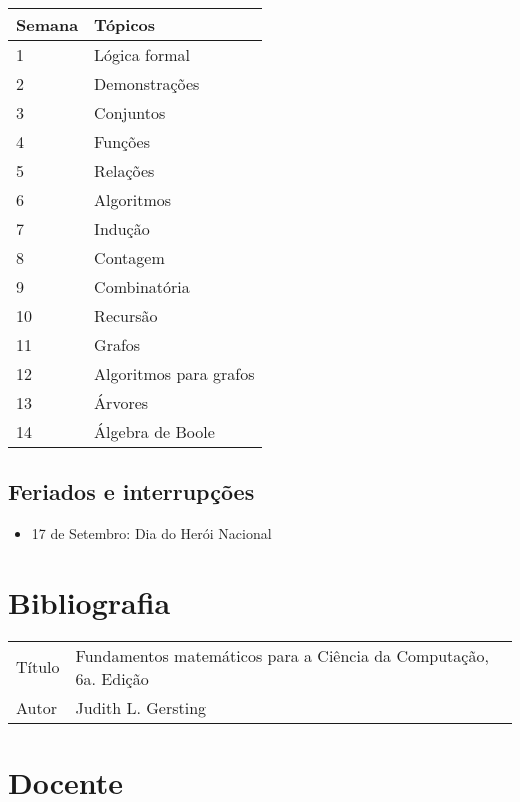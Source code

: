 \begin{table}[H]
	\centering
	\begin{tabular}{ll}%
	\toprule
	\textbf{Semana} & \textbf{Tópicos} \\ 
	\midrule
	1	&	Lógica formal\\ 
    2 	&	Demonstrações\\
    3	&	Conjuntos\\
    4	&	Funções\\
    5	&	Relações\\
    6	&	Algoritmos\\
    7	&	Indução\\
    8	&	Contagem\\
    9	&	Combinatória\\
    10	&	Recursão\\
    11	&	Grafos\\
    12	&	Algoritmos para grafos\\
    13	&	Árvores\\
    14	&	Álgebra de Boole\\
 	 \bottomrule
 	 \end{tabular}
 	 \centering
\end{table}


\subsection*{Feriados e interrupções}

\begin{itemize}
  \item 17 de Setembro: Dia do Herói Nacional
\end{itemize}

\section*{Bibliografia}

\begin{table}[H]
	\begin{tabular}{ll}%
		Título & Fundamentos matemáticos para a Ciência da Computação, 6a. Edição\\
		Autor & Judith L. Gersting\\
	\end{tabular}
\end{table}


\section*{Docente}

